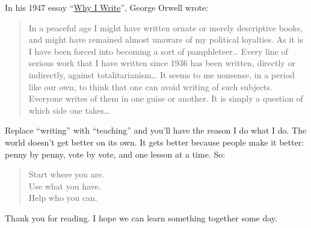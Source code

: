 In his 1947 essay ``\href{http://www.resort.com/~prime8/Orwell/whywrite.html}{Why I Write}'', George Orwell wrote:

\begin{quote}\setlength{\parindent}{0pt}
In a peaceful age I might have written ornate or merely descriptive
books, and might have remained almost unaware of my political
loyalties. As it is I have been forced into becoming a sort of
pamphleteer\ldots{} Every line of serious work that I have
written since 1936 has been written, directly or indirectly, against
totalitarianism\ldots{} It seems to me nonsense, in a period
like our own, to think that one can avoid writing of such subjects.
Everyone writes of them in one guise or another. It is simply a
question of which side one takes\ldots{}
\end{quote}

Replace ``writing'' with ``teaching'' and you'll have the reason I do what I
do. The world doesn't get better on its own. It gets better because
people make it better: penny by penny, vote by vote, and one lesson at a
time. So:

\begin{quote}\setlength{\parindent}{0pt}
Start where you are.\\
Use what you have.\\
Help who you can.
\end{quote}

Thank you for reading. I hope we can learn something together some day.
